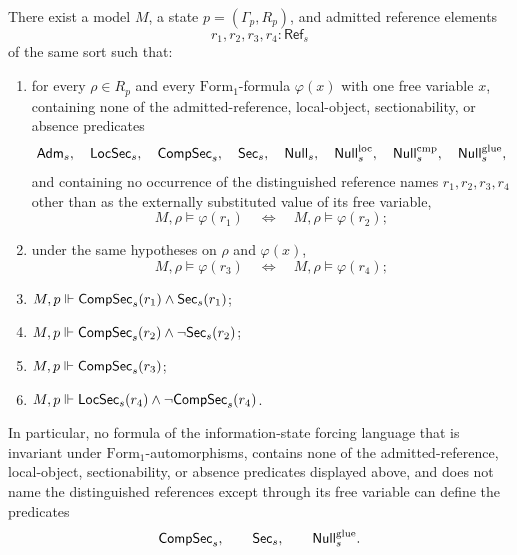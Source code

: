 \begin{theorem}\label{thm:pointwise-irreducibility}
There exist a model $M$, a state $p=(\Gamma_p,R_p)$, and admitted reference
elements
\[
r_1,r_2,r_3,r_4:\mathsf{Ref}_s
\]
of the same sort such that:
\begin{enumerate}[label=(\roman*),nosep]
\item for every $\rho\in R_p$ and every $\mathrm{Form}_1$-formula $\varphi(x)$
with one free variable $x$, containing none of the admitted-reference,
local-object, sectionability, or absence predicates
\[
\mathsf{Adm}_s,\quad \mathsf{LocSec}_s,\quad \mathsf{CompSec}_s,\quad \mathsf{Sec}_s,\quad
\mathsf{Null}_s,\quad \mathsf{Null}^{\mathrm{loc}}_s,\quad
\mathsf{Null}^{\mathrm{cmp}}_s,\quad \mathsf{Null}^{\mathrm{glue}}_s,
\]
and containing no occurrence of the distinguished reference names $r_1,r_2,r_3,r_4$ other than as the externally substituted value of its free variable,
\[
M,\rho\models\varphi(r_1)
\quad\Longleftrightarrow\quad
M,\rho\models\varphi(r_2);
\]
\item under the same hypotheses on $\rho$ and $\varphi(x)$,
\[
M,\rho\models\varphi(r_3)
\quad\Longleftrightarrow\quad
M,\rho\models\varphi(r_4);
\]
\item $M,p\Vdash \mathsf{CompSec}_s(r_1)\land \mathsf{Sec}_s(r_1)$;
\item $M,p\Vdash \mathsf{CompSec}_s(r_2)\land \neg\mathsf{Sec}_s(r_2)$;
\item $M,p\Vdash \mathsf{CompSec}_s(r_3)$;
\item $M,p\Vdash \mathsf{LocSec}_s(r_4)\land \neg\mathsf{CompSec}_s(r_4)$.
\end{enumerate}
In particular, no formula of the information-state forcing language that is
invariant under $\mathrm{Form}_1$-automorphisms, contains none of the
admitted-reference, local-object, sectionability, or absence predicates
displayed above, and does not name the distinguished references except through
its free variable can define the predicates
\[
\mathsf{CompSec}_s,
\qquad
\mathsf{Sec}_s,
\qquad
\mathsf{Null}^{\mathrm{glue}}_s.
\]
\end{theorem}

